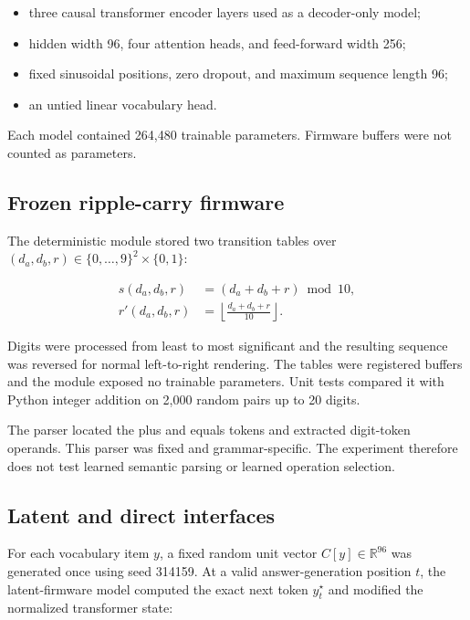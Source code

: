\documentclass[11pt]{article}
\begin{document}
\begin{itemize}
    \item three causal transformer encoder layers used as a decoder-only model;
    \item hidden width 96, four attention heads, and feed-forward width 256;
    \item fixed sinusoidal positions, zero dropout, and maximum sequence length
    96;
    \item an untied linear vocabulary head.
\end{itemize}

Each model contained 264{,}480 trainable parameters. Firmware buffers were not
counted as parameters.

\subsection{Frozen ripple-carry firmware}

The deterministic module stored two transition tables over
\((d_a,d_b,r)\in\{0,\dots,9\}^2\times\{0,1\}\):

\begin{align}
s(d_a,d_b,r) &= (d_a+d_b+r)\bmod 10,\\
r'(d_a,d_b,r) &= \left\lfloor\frac{d_a+d_b+r}{10}\right\rfloor.
\end{align}

Digits were processed from least to most significant and the resulting
sequence was reversed for normal left-to-right rendering. The tables were
registered buffers and the module exposed no trainable parameters. Unit tests
compared it with Python integer addition on 2{,}000 random pairs up to 20
digits.

The parser located the plus and equals tokens and extracted digit-token
operands. This parser was fixed and grammar-specific. The experiment therefore
does not test learned semantic parsing or learned operation selection.

\subsection{Latent and direct interfaces}

For each vocabulary item \(y\), a fixed random unit vector \(C[y]\in
\mathbb{R}^{96}\) was generated once using seed 314159. At a valid
answer-generation position \(t\), the latent-firmware model computed the exact
next token \(y_t^\star\) and modified the normalized transformer state:
\end{document}
